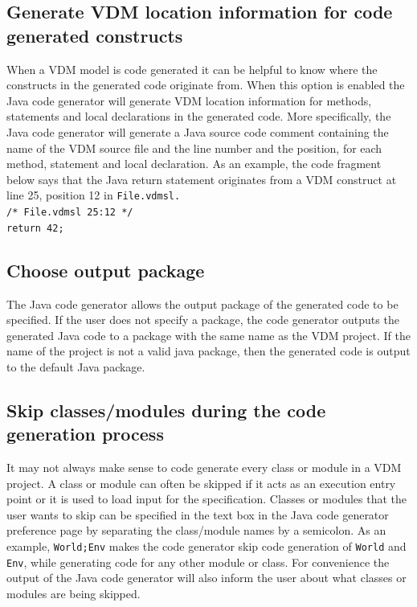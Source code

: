 \subsection{Generate VDM location information for code generated constructs}
When a VDM model is code generated it can be helpful to know where the constructs in the generated
code originate from. When this option is enabled the Java code generator will generate
VDM location information for methods, statements and local declarations in the generated code.
More specifically, the Java code generator will generate a Java source code comment containing
the name of the VDM source file and the line number and the position, for each method, statement
and local declaration. As an example, the code fragment below says that the Java return statement
originates from a VDM construct at line 25, position 12 in \texttt{File.vdmsl.\\
/* File.vdmsl 25:12 */\\
return 42;}

\subsection{Choose output package}
The Java code generator allows the output package of the generated code to be specified. If the
user does not specify a package, the code generator outputs the generated Java code to a package
with the same name as the VDM project. If the name of the project is not a valid java package,
then the generated code is output to the default Java package.

\subsection{Skip classes/modules during the code generation process}
It may not always make sense to code generate every class or module in a VDM project. A class
or module can often be skipped if it acts as an execution entry point or it is used to load input for
the specification. Classes or modules that the user wants to skip can be specified in the text box
in the Java code generator preference page by separating the class/module names by a semicolon.
As an example, \texttt{World;Env} makes the code generator skip code generation of \texttt{World} and \texttt{Env}, while generating code for any other module or class. For convenience the output of the Java code
generator will also inform the user about what classes or modules are being skipped.

\newpage
